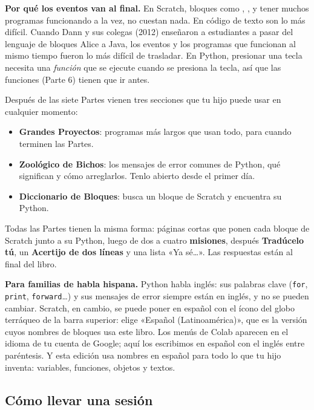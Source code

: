 \textbf{Por qué los eventos van al final.} En Scratch, bloques como , , y tener muchos programas funcionando a la vez, no cuestan nada. En código de texto son lo más difícil. Cuando Dann y sus colegas (2012) enseñaron a estudiantes a pasar del lenguaje de bloques Alice a Java, los eventos y los programas que funcionan al mismo tiempo fueron lo más difícil de trasladar. En Python, presionar una tecla necesita una \emph{función} que se ejecute cuando se presiona la tecla, así que las funciones (Parte 6) tienen que ir antes.

Después de las siete Partes vienen tres secciones que tu hijo puede usar en cualquier momento:
\begin{itemize}
  \item \textbf{Grandes Proyectos}: programas más largos que usan todo, para cuando terminen las Partes.
  \item \textbf{Zoológico de Bichos}: los mensajes de error comunes de Python, qué significan y cómo arreglarlos. Tenlo abierto desde el primer día.
  \item \textbf{Diccionario de Bloques}: busca un bloque de Scratch y encuentra su Python.
\end{itemize}

Todas las Partes tienen la misma forma: páginas cortas que ponen cada bloque de Scratch junto a su Python, luego de dos a cuatro \textbf{misiones}, después \textbf{Tradúcelo tú}, un \textbf{Acertijo de dos líneas} y una lista «Ya sé\ldots». Las respuestas están al final del libro.

\textbf{Para familias de habla hispana.} Python habla inglés: sus palabras clave (\texttt{for}, \texttt{print}, \texttt{forward}\ldots) y sus mensajes de error siempre están en inglés, y no se pueden cambiar. Scratch, en cambio, se puede poner en español con el ícono del globo terráqueo de la barra superior: elige «Español (Latinoamérica)», que es la versión cuyos nombres de bloques usa este libro. Los menús de Colab aparecen en el idioma de tu cuenta de Google; aquí los escribimos en español con el inglés entre paréntesis. Y esta edición usa nombres en español para todo lo que tu hijo inventa: variables, funciones, objetos y textos.

\subsection*{Cómo llevar una sesión}

